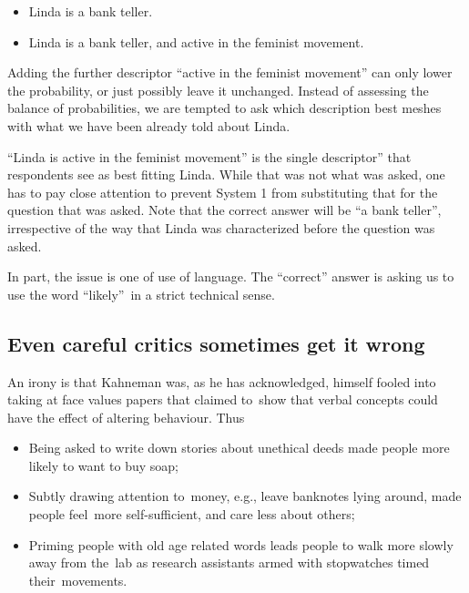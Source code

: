 \documentclass[
  10pt,
  b5paper]{book}
\providecommand{\tightlist}{%
  \setlength{\itemsep}{0pt}\setlength{\parskip}{0pt}}
\begin{document}
\begin{itemize}
\tightlist
\item
  Linda is a bank teller.
\item
  Linda is a bank teller, and active in the feminist
  movement.
\end{itemize}

Adding the further descriptor ``active in the feminist
movement'' can only lower the probability, or just possibly
leave it unchanged. Instead of assessing the balance of
probabilities, we are tempted to ask which description best
meshes with what we have been already told about Linda.

``Linda is active in the feminist movement'' is the single
descriptor'' that respondents see as best fitting Linda.
While that was not what was asked, one has to pay close
attention to prevent System 1 from substituting that for
the question that was asked. Note that the correct
answer will be ``a bank teller'', irrespective of the way
that Linda was characterized before the question was asked.

In part, the issue is one of use of language. The ``correct''
answer is asking us to use the word ``likely''~in a strict
technical sense.

\hypertarget{even-careful-critics-sometimes-get-it-wrong}{%
\subsection*{Even careful critics sometimes get it wrong}\label{even-careful-critics-sometimes-get-it-wrong}}

An irony is that Kahneman was, as he has acknowledged,
himself fooled into taking at face values papers that
claimed to~show that verbal concepts could have the
effect of altering behaviour. Thus

\begin{itemize}
\tightlist
\item
  Being asked to write down stories about unethical deeds
  made people more likely to want to buy soap;
\item
  Subtly drawing attention to~money, e.g., leave banknotes
  lying around, made people feel~more self-sufficient, and
  care less about others;
\item
  Priming people with old age related words leads people to
  walk more slowly away from the~lab as research
  assistants armed with stopwatches timed their~movements.
\end{itemize}
\end{document}
